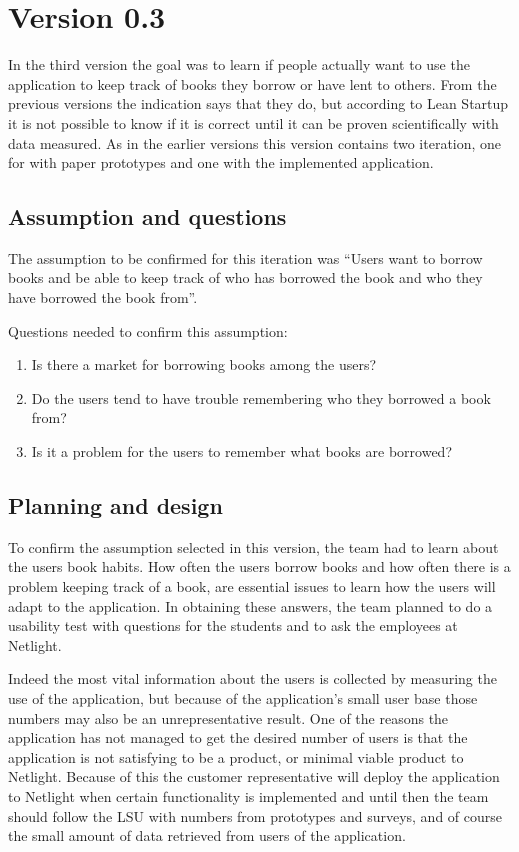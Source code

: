 \section{Version 0.3}

In the third version the goal was to learn if people actually want to use the application to keep track of books they borrow or have lent to others. From the previous versions the indication says that they do, but according to Lean Startup it is not possible to know if it is correct until it can be proven scientifically with data measured. As in the earlier versions this version contains two iteration, one for with paper prototypes and one with the implemented application.
\subsection{Assumption and questions}
The assumption to be confirmed for this iteration was
“Users want to borrow books and be able to keep track of who has borrowed the book and who they have borrowed the book from”.

Questions needed to confirm this assumption: 
\begin{enumerate}
\item Is there a market for borrowing books among the users?
\item Do the users tend to have trouble remembering who they borrowed a book from?
\item Is it a problem for the users to remember what books are borrowed?
\end{enumerate}

\subsection{Planning and design}
To confirm the assumption selected in this version, the team had to learn about the users book habits. How often the users borrow books and how often there is a problem keeping track of a book, are essential issues to learn how the users will adapt to the application. In obtaining these answers, the team planned to do a usability test with questions for the students and to ask the employees at Netlight. 

Indeed the most vital information about the users is collected by measuring the use of the application, but because of the application’s small user base those numbers may also be an unrepresentative result. One of the reasons the application has not managed to get the desired number of users is that the application is not satisfying to be a product, or minimal viable product to Netlight. Because of this the customer representative will deploy the application to Netlight when certain functionality is implemented and until then the team should follow the \gls{LSU} with numbers from prototypes and surveys, and of course the small amount of data retrieved from users of the application. 

